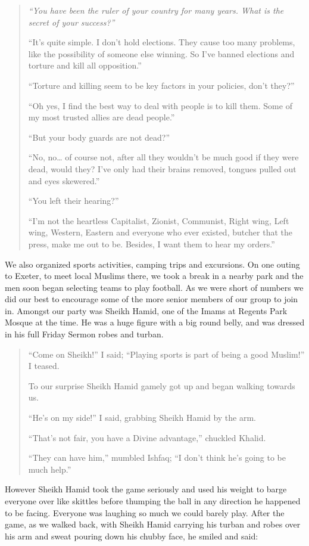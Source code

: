 \documentclass[12pt]{memoir}
\begin{document}
\begin{quote}
\itshape
“You have been the ruler of your country for many years.
What is the secret of your success?”

“It’s quite simple.
I don’t hold elections.
They cause too many problems, like the possibility of someone else winning.
So I’ve banned elections and torture and kill all opposition.”

“Torture and killing seem to be key factors in your policies, don’t they?”

“Oh yes, I find the best way to deal with people is to kill them.
Some of my most trusted allies are dead people.”

“But your body guards are not dead?”

“No, no… of course not,
after all they wouldn’t be much good if they were dead, would they?
I’ve only had their brains removed, tongues pulled out and eyes skewered.”

“You left their hearing?”

“I’m not the heartless Capitalist, Zionist, Communist, Right wing,
Left wing, Western, Eastern and everyone who ever existed,
butcher that the press, make me out to be.
Besides, I want them to hear my orders.”
\end{quote}

We also organized sports activities, camping trips and excursions.
On one outing to Exeter, to meet local Muslims there,
we took a break in a nearby park
and the men soon began selecting teams to play football.
As we were short of numbers we did our best to encourage
some of the more senior members of our group to join in.
Amongst our party was Sheikh Hamid,
one of the Imams at Regents Park Mosque at the time.
He was a huge figure with a big round belly,
and was dressed in his full Friday Sermon robes and turban.

\begin{quote}
“Come on Sheikh!” I said;
“Playing sports is part of being a good Muslim!” I teased.

To our surprise Sheikh Hamid gamely got up and began walking towards us.

“He’s on my side!”
I said, grabbing Sheikh Hamid by the arm.

“That’s not fair, you have a Divine advantage,” chuckled Khalid.

“They can have him,” mumbled Ishfaq;
“I don’t think he’s going to be much help.”
\end{quote}

However Sheikh Hamid took the game seriously
and used his weight to barge everyone over like skittles
before thumping the ball in any direction he happened to be facing.
Everyone was laughing so much we could barely play.
After the game, as we walked back, with Sheikh Hamid carrying his turban
and robes over his arm and sweat pouring down his chubby face,
he smiled and said:
\end{document}
